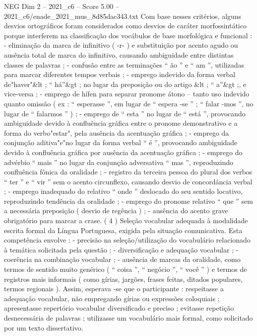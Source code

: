 \begin{textsample}{NEG Dim 2 – 2021\_c6 – Score 5.00 – 2021\_c6/enade\_2021\_mus\_8d85dac343.txt}
Com base nesses critérios, alguns desvios ortográficos foram considerados como desvios de caráter morfossintático porque interferem na classificação dos vocábulos de base morfológica e funcional : - eliminação da marca de infinitivo ( -r- ) e substituição por acento agudo ou ausência total de marca do infinitivo, causando ambiguidade entre distintas classes de palavras ; - confusão entre as terminações “ ão ” e “ am ”, utilizadas para marcar diferentes tempos verbais ; - emprego indevido da forma verbal de"haver"\&lt ; “ há”\&gt ; no lugar da preposição ou do artigo \&lt ; “ a”\&gt ;, e vice-versa ; - emprego de hífen para separar pronome átono – tanto uso indevido quanto omissão ( ex : “ esperasse ”, em lugar de “ espera -se ” ; “ falar -mos ”, no lugar de “ falarmos ” ) ; - emprego de “ esta ” no lugar de “ está ”, provocando ambiguidade devido à confluência gráfica entre o pronome demonstrativo e a forma do verbo"estar", pela ausência da acentuação gráfica ; - emprego da conjunção aditiva"e"no lugar da forma verbal “ é ”, provocando ambiguidade devido à confluência gráfica por ausência da acentuação gráfica ; - emprego do advérbio “ mais ” no lugar da conjunção adversativa “ mas ”, reproduzindo confluência fônica da oralidade ; - registro da terceira pessoa do plural dos verbos “ ter ” e “ vir ” sem o acento circunflexo, causando desvio de concordância verbal ; - emprego inadequado do relativo “ onde ” deslocado do seu sentido locativo, reproduzindo tendência da oralidade ; - emprego do pronome relativo “ que ” sem a necessária preposição ( desvio de regência ) ; - ausência do acento grave obrigatório para marcar a crase. ( 4 ) Seleção vocabular adequada à modalidade escrita formal da Língua Portuguesa, exigida pela situação comunicativa.
Esta competência envolve : - precisão na seleção/utilização do vocabulário relacionado à temática solicitada pela questão ; - diversificação e adequação vocabular ; - coerência na combinação vocabular ; - ausência de marcas da oralidade, como termos de sentido muito genérico ( “ coisa ”, “ negócio ”, “ você ” ) e termos de registros mais informais ( como gírias, jargões, frases feitas, ditados populares, termos regionais ).
Assim, esperava -se que o participante : respeitasse a adequação vocabular, não empregando gírias ou expressões coloquiais ; apresentasse repertório vocabular diversificado e preciso ; evitasse repetição desnecessária de palavras ; utilizasse um vocabulário mais formal, como solicitado por um texto dissertativo.

\end{textsample}
